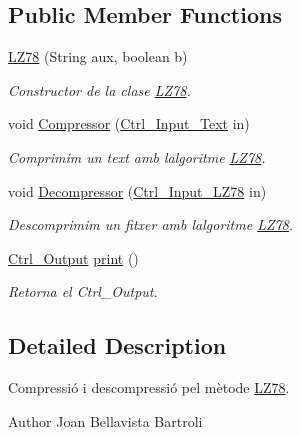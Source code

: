 \subsection*{Public Member Functions}
\begin{DoxyCompactItemize}
\item 
\hyperlink{classdomini_1_1algorithm_1_1LZ78_afb5950cfc6a4887611298f6c1fd83d26}{L\+Z78} (String aux, boolean b)
\begin{DoxyCompactList}\small\item\em Constructor de la clase \hyperlink{classdomini_1_1algorithm_1_1LZ78}{L\+Z78}. \end{DoxyCompactList}\item 
void \hyperlink{classdomini_1_1algorithm_1_1LZ78_a545765a19a5eeababaeeee20fc480116}{Compressor} (\hyperlink{classpersistencia_1_1input_1_1Ctrl__Input__Text}{Ctrl\+\_\+\+Input\+\_\+\+Text} in)
\begin{DoxyCompactList}\small\item\em Comprimim un text amb l\textquotesingle{}algoritme \hyperlink{classdomini_1_1algorithm_1_1LZ78}{L\+Z78}. \end{DoxyCompactList}\item 
void \hyperlink{classdomini_1_1algorithm_1_1LZ78_a9dee2b172b79054a9312b47abce7002c}{Decompressor} (\hyperlink{classpersistencia_1_1input_1_1Ctrl__Input__LZ78}{Ctrl\+\_\+\+Input\+\_\+\+L\+Z78} in)
\begin{DoxyCompactList}\small\item\em Descomprimim un fitxer amb l\textquotesingle{}algoritme \hyperlink{classdomini_1_1algorithm_1_1LZ78}{L\+Z78}. \end{DoxyCompactList}\item 
\hyperlink{classpersistencia_1_1output_1_1Ctrl__Output}{Ctrl\+\_\+\+Output} \hyperlink{classdomini_1_1algorithm_1_1LZ78_a21d2b0f1ce5f3b4603abe6bfff12b494}{print} ()
\begin{DoxyCompactList}\small\item\em Retorna el Ctrl\+\_\+\+Output. \end{DoxyCompactList}\end{DoxyCompactItemize}


\subsection{Detailed Description}
Compressió i descompressió pel mètode \hyperlink{classdomini_1_1algorithm_1_1LZ78}{L\+Z78}. 

\begin{DoxyAuthor}{Author}
Joan Bellavista Bartroli 
\end{DoxyAuthor}


